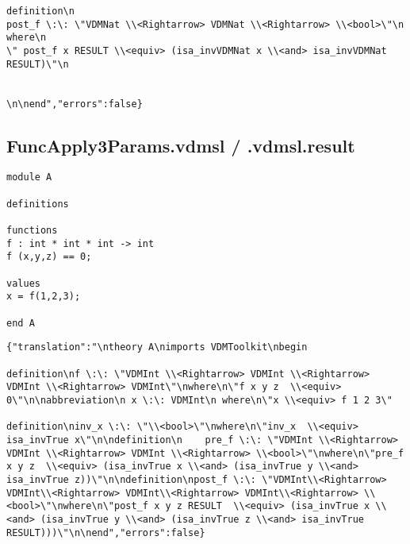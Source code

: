 \begin{appendices}
\begin{lstlisting}
definition\n
post_f \:\: \"VDMNat \\<Rightarrow> VDMNat \\<Rightarrow> \\<bool>\"\n
where\n
\" post_f x RESULT \\<equiv> (isa_invVDMNat x \\<and> isa_invVDMNat RESULT)\"\n

 
\n\nend","errors":false}
\end{lstlisting}

\subsection{FuncApply3Params.vdmsl / .vdmsl.result}
\begin{lstlisting}
module A

definitions

functions
f : int * int * int -> int
f (x,y,z) == 0;

values
x = f(1,2,3);

end A
\end{lstlisting}

\begin{lstlisting}
{"translation":"\ntheory A\nimports VDMToolkit\nbegin

definition\nf \:\: \"VDMInt \\<Rightarrow> VDMInt \\<Rightarrow> VDMInt \\<Rightarrow> VDMInt\"\nwhere\n\"f x y z  \\<equiv> 0\"\n\nabbreviation\n x \:\: VDMInt\n where\n\"x \\<equiv> f 1 2 3\"

definition\ninv_x \:\: \"\\<bool>\"\nwhere\n\"inv_x  \\<equiv> isa_invTrue x\"\n\ndefinition\n    pre_f \:\: \"VDMInt \\<Rightarrow> VDMInt \\<Rightarrow> VDMInt \\<Rightarrow> \\<bool>\"\nwhere\n\"pre_f x y z  \\<equiv> (isa_invTrue x \\<and> (isa_invTrue y \\<and> isa_invTrue z))\"\n\ndefinition\npost_f \:\: \"VDMInt\\<Rightarrow> VDMInt\\<Rightarrow> VDMInt\\<Rightarrow> VDMInt\\<Rightarrow> \\<bool>\"\nwhere\n\"post_f x y z RESULT  \\<equiv> (isa_invTrue x \\<and> (isa_invTrue y \\<and> (isa_invTrue z \\<and> isa_invTrue RESULT)))\"\n\nend","errors":false}
\end{lstlisting}


\end{appendices}
